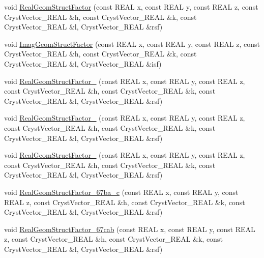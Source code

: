\begin{DoxyCompactItemize}
\item 
void \mbox{\hyperlink{namespace_obj_cryst_a7156318988075f0da9afae54c0b6342b}{Real\+Geom\+Struct\+Factor}} (const R\+E\+AL x, const R\+E\+AL y, const R\+E\+AL z, const Cryst\+Vector\+\_\+\+R\+E\+AL \&h, const Cryst\+Vector\+\_\+\+R\+E\+AL \&k, const Cryst\+Vector\+\_\+\+R\+E\+AL \&l, Cryst\+Vector\+\_\+\+R\+E\+AL \&rsf)
\item 
void \mbox{\hyperlink{namespace_obj_cryst_aa416ad4f8edfaabd682ccbc7cf95a29b}{Imag\+Geom\+Struct\+Factor}} (const R\+E\+AL x, const R\+E\+AL y, const R\+E\+AL z, const Cryst\+Vector\+\_\+\+R\+E\+AL \&h, const Cryst\+Vector\+\_\+\+R\+E\+AL \&k, const Cryst\+Vector\+\_\+\+R\+E\+AL \&l, Cryst\+Vector\+\_\+\+R\+E\+AL \&isf)
\item 
void \mbox{\hyperlink{namespace_obj_cryst_acba26788bc095d3f25b8583191e3cef6}{Real\+Geom\+Struct\+Factor\+\_}} (const R\+E\+AL x, const R\+E\+AL y, const R\+E\+AL z, const Cryst\+Vector\+\_\+\+R\+E\+AL \&h, const Cryst\+Vector\+\_\+\+R\+E\+AL \&k, const Cryst\+Vector\+\_\+\+R\+E\+AL \&l, Cryst\+Vector\+\_\+\+R\+E\+AL \&rsf)
\item 
void \mbox{\hyperlink{namespace_obj_cryst_aab08fdfd88756fd3658b5aac00d56b71}{Real\+Geom\+Struct\+Factor\+\_}} (const R\+E\+AL x, const R\+E\+AL y, const R\+E\+AL z, const Cryst\+Vector\+\_\+\+R\+E\+AL \&h, const Cryst\+Vector\+\_\+\+R\+E\+AL \&k, const Cryst\+Vector\+\_\+\+R\+E\+AL \&l, Cryst\+Vector\+\_\+\+R\+E\+AL \&rsf)
\item 
void \mbox{\hyperlink{namespace_obj_cryst_ab0dc330256ace18153a3344146e97da8}{Real\+Geom\+Struct\+Factor\+\_}} (const R\+E\+AL x, const R\+E\+AL y, const R\+E\+AL z, const Cryst\+Vector\+\_\+\+R\+E\+AL \&h, const Cryst\+Vector\+\_\+\+R\+E\+AL \&k, const Cryst\+Vector\+\_\+\+R\+E\+AL \&l, Cryst\+Vector\+\_\+\+R\+E\+AL \&rsf)
\item 
void \mbox{\hyperlink{namespace_obj_cryst_a5cc947568ed264bc5c846e590e41d071}{Real\+Geom\+Struct\+Factor\+\_\+67ba\+\_\+c}} (const R\+E\+AL x, const R\+E\+AL y, const R\+E\+AL z, const Cryst\+Vector\+\_\+\+R\+E\+AL \&h, const Cryst\+Vector\+\_\+\+R\+E\+AL \&k, const Cryst\+Vector\+\_\+\+R\+E\+AL \&l, Cryst\+Vector\+\_\+\+R\+E\+AL \&rsf)
\item 
void \mbox{\hyperlink{namespace_obj_cryst_ab7b9de18fea72394b7bd491927039d0d}{Real\+Geom\+Struct\+Factor\+\_\+67cab}} (const R\+E\+AL x, const R\+E\+AL y, const R\+E\+AL z, const Cryst\+Vector\+\_\+\+R\+E\+AL \&h, const Cryst\+Vector\+\_\+\+R\+E\+AL \&k, const Cryst\+Vector\+\_\+\+R\+E\+AL \&l, Cryst\+Vector\+\_\+\+R\+E\+AL \&rsf)

\end{DoxyCompactItemize}
